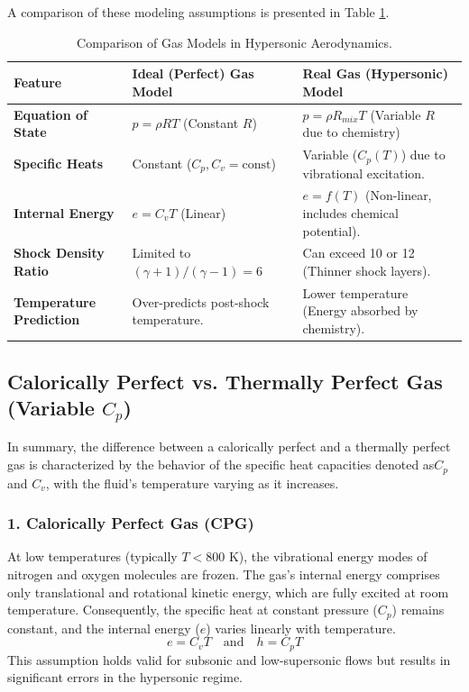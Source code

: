 A comparison of these modeling assumptions is presented in Table \ref{tab:gas_models}.

\begin{table}[H]
    \centering
    \caption{Comparison of Gas Models in Hypersonic Aerodynamics.}
    \label{tab:gas_models}
    \begin{tabularx}{\textwidth}{|l|X|X|}
        \hline
        \rowcolor{gray!20} \textbf{Feature} & \textbf{Ideal (Perfect) Gas Model} & \textbf{Real Gas (Hypersonic) Model} \\ \hline
        \textbf{Equation of State} & $p = \rho R T$ (Constant $R$) & $p = \rho R_{mix} T$ (Variable $R$ due to chemistry) \\ \hline
        \textbf{Specific Heats} & Constant ($C_p, C_v = \text{const}$) & Variable ($C_p(T)$) due to vibrational excitation. \\ \hline
        \textbf{Internal Energy} & $e = C_v T$ (Linear) & $e = f(T)$ (Non-linear, includes chemical potential). \\ \hline
        \textbf{Shock Density Ratio} & Limited to $(\gamma+1)/(\gamma-1) = 6$ & Can exceed 10 or 12 (Thinner shock layers). \\ \hline
        \textbf{Temperature Prediction} & Over-predicts post-shock temperature. & Lower temperature (Energy absorbed by chemistry). \\ \hline
    \end{tabularx}
\end{table}

\subsection{Calorically Perfect vs. Thermally Perfect Gas (Variable \texorpdfstring{$C_p$}{C-p})}

\par
In summary, the difference between a calorically perfect and a thermally perfect gas is characterized by the behavior of the specific heat capacities denoted as$C_p$ and $C_v$, with the fluid's temperature varying as it increases.



\subsubsection*{1. Calorically Perfect Gas (CPG)}
At low temperatures (typically $T < 800$ K), the vibrational energy modes of nitrogen and oxygen molecules are frozen. The gas's internal energy comprises only translational and rotational kinetic energy, which are fully excited at room temperature. Consequently, the specific heat at constant pressure ($C_p$) remains constant, and the internal energy ($e$) varies linearly with temperature.
\begin{equation}
    e = C_v T \quad \text{and} \quad h = C_p T
\end{equation}
This assumption holds valid for subsonic and low-supersonic flows but results in significant errors in the hypersonic regime.
\par
